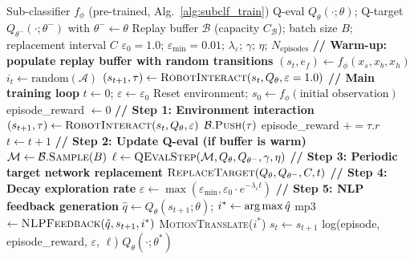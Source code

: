 \documentclass[12pt,a4paper]{article}
\theoremstyle{definition}
\theoremstyle{plain}
\theoremstyle{remark}
\newcommand{\argmax}{\operatornamewithlimits{arg\,max}}
\newcommand{\Qeval}{Q_\theta}
\newcommand{\Qtgt}{Q_{\theta^-}}
\begin{document}
\begin{algorithm}[H]
\caption{Complete MIVA-KNIGHT-RL DQN Training Loop}
\label{alg:full_dqn}
\begin{algorithmic}[1]
\Require Sub-classifier $f_\phi$ (pre-trained, Alg.~\ref{alg:subclf_train})
\Require Q-eval $\Qeval(\cdot;\theta)$; Q-target $\Qtgt(\cdot;\theta^-)$ with $\theta^- \gets \theta$
\Require Replay buffer $\mathcal{B}$ (capacity $C_\mathcal{B}$); batch size $B$; replacement interval $C$
\Require $\varepsilon_0=1.0$; $\varepsilon_{\min}=0.01$; $\lambda_\varepsilon$; $\gamma$; $\eta$; $N_{\text{episodes}}$
\State \textbf{// Warm-up: populate replay buffer with random transitions}
  \State $(s_t, e_f) \gets f_\phi(x_s, x_b, x_h)$ 
  \State $i_t \gets \text{random}(\mathcal{A})$ 
  \State $(s_{t+1}, \tau) \gets \textsc{RobotInteract}(s_t, \Qeval, \varepsilon=1.0)$
\EndFor
\State \textbf{// Main training loop}
\State $t \gets 0$; $\varepsilon \gets \varepsilon_0$
  \State Reset environment; $s_0 \gets f_\phi(\text{initial observation})$
  \State episode\_reward $\gets 0$
  \Repeat
    \State \textbf{// Step 1: Environment interaction}
    \State $(s_{t+1}, \tau) \gets \textsc{RobotInteract}(s_t, \Qeval, \varepsilon)$ 
    \State $\mathcal{B}.\textsc{Push}(\tau)$ 
    \State episode\_reward $\mathrel{+}= \tau.r$
    \State $t \gets t + 1$
    \State \textbf{// Step 2: Update Q-eval (if buffer is warm)}
      \State $\mathcal{M} \gets \mathcal{B}.\textsc{Sample}(B)$ 
      \State $\ell \gets \textsc{QEvalStep}(\mathcal{M}, \Qeval, \Qtgt, \gamma, \eta)$ 
    \EndIf
    \State \textbf{// Step 3: Periodic target network replacement}
    \State $\textsc{ReplaceTarget}(\Qeval, \Qtgt, C, t)$ 
    \State \textbf{// Step 4: Decay exploration rate}
    \State $\varepsilon \gets \max(\varepsilon_{\min}, \varepsilon_0 \cdot e^{-\lambda_\varepsilon t})$
    \State \textbf{// Step 5: NLP feedback generation}
    \State $\hat{q} \gets \Qeval(s_{t+1};\theta)$; $i^* \gets \argmax \hat{q}$
    \State mp3 $\gets \textsc{NLPFeedback}(\hat{q}, s_{t+1}, i^*)$ 
    \State \textsc{MotionTranslate}($i^*$) 
    \State $s_t \gets s_{t+1}$
  \State log(episode, episode\_reward, $\varepsilon$, $\ell$)
\EndFor
\State \Return $\Qeval(\cdot;\theta^*)$ 
\end{algorithmic}
\end{algorithm}
\end{document}
